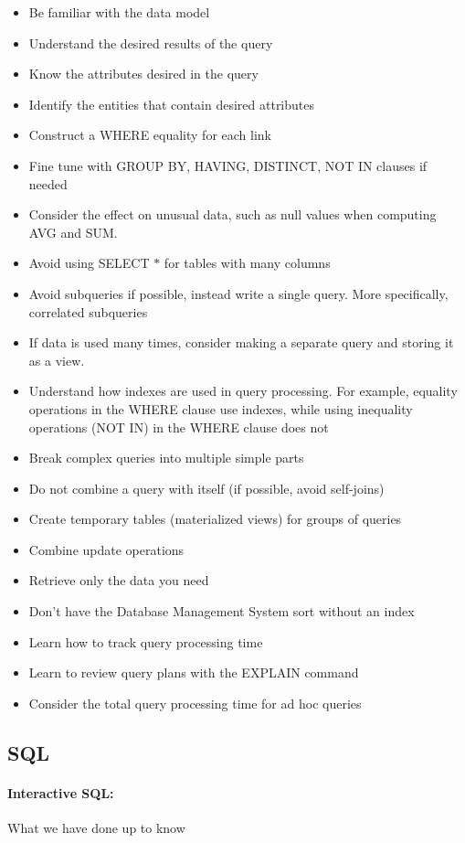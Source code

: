 \documentclass[12pt]{article}
\begin{document}
\begin{itemize}
	\item{Be familiar with the data model}
	\item{Understand the desired results of the query}
	\item{Know the attributes desired in the query}
	\item{Identify the entities that contain desired attributes}
	\item{Construct a WHERE equality for each link}
	\item{Fine tune with GROUP BY, HAVING, DISTINCT, NOT IN clauses if needed}
	\item{Consider the effect on unusual data, such as null values when computing AVG and SUM.}
	\item{Avoid using SELECT $*$ for tables with many columns}
	\item{Avoid subqueries if possible, instead write a single query. More specifically, correlated subqueries}
	\item{If data is used many times, consider making a separate query and storing it as a view.}
	\item{Understand how indexes are used in query processing. For example, equality operations in the WHERE clause use indexes, while using inequality operations (NOT IN) in the WHERE clause does not}
	\item{Break complex queries into multiple simple parts}
	\item{Do not combine a query with itself (if possible, avoid self-joins)}
	\item{Create temporary tables (materialized views) for groups of queries}
	\item{Combine update operations}
	\item{Retrieve only the data you need}
	\item{Don't have the Database Management System sort without an index}
	\item{Learn how to track query processing time}
	\item{Learn to review query plans with the EXPLAIN command}
	\item{Consider the total query processing time for ad hoc queries}
\end{itemize}

\subsection{SQL}

\paragraph{Interactive SQL:} What we have done up to know
\end{document}
